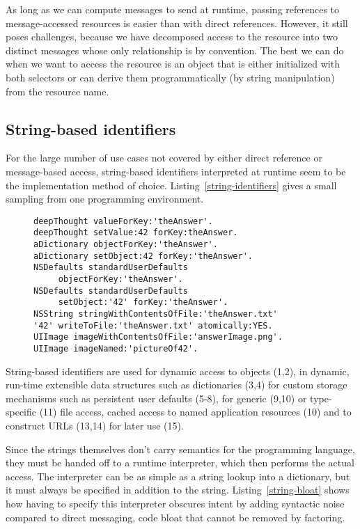 \documentclass[preprint,authoryear]{acm_proc_article-sp}
\begin{document}
As long as we can compute messages to send at runtime,
passing references to message-accessed resources is easier than with
direct references.  However, it still poses challenges, because we have decomposed
access to the resource into two distinct messages whose only relationship is by 
convention.  The best we can do when we want to access the resource
is an object that is either initialized with both selectors or can derive them
programmatically (by string manipulation) from the resource name.

\subsection{String-based identifiers}

For the large number of use cases not covered by either direct reference or
message-based access, string-based identifiers interpreted at runtime 
seem to be the implementation method of choice.  Listing~\ref{string-identifiers}
gives a small sampling from one programming environment.

\begin{figure}[htbp]
\begin{lstlisting}[style=numbers,label=string-identifiers,caption=Variants of string-based identifiers.]
deepThought valueForKey:'theAnswer'.
deepThought setValue:42 forKey:theAnswer.
aDictionary objectForKey:'theAnswer'.
aDictionary setObject:42 forKey:'theAnswer'.
NSDefaults standardUserDefaults
	 objectForKey:'theAnswer'.
NSDefaults standardUserDefaults
	 setObject:'42' forKey:'theAnswer'.
NSString stringWithContentsOfFile:'theAnswer.txt'
'42' writeToFile:'theAnswer.txt' atomically:YES.
UIImage imageWithContentsOfFile:'answerImage.png'.
UIImage imageNamed:'pictureOf42'.
\end{lstlisting}
\end{figure}

String-based identifiers are used for dynamic access to objects (1,2), 
in dynamic, run-time extensible data structures such as
dictionaries (3,4)  for custom storage mechanisms such as persistent
user defaults (5-8), for generic (9,10) or type-specific (11) file access, cached
access to named application resources (10) and to construct URLs (13,14)
for later use (15).

Since the strings themselves don't carry semantics for the programming language,
they must be handed off to a runtime interpreter, which then performs the actual access.  The 
interpreter can be as simple as a  string lookup into a dictionary,
but it must always be specified in addition to the string.  Listing~\ref{string-bloat}
shows how having to specify this interpreter obscures intent by adding syntactic
noise compared to direct messaging, code bloat that cannot be removed by factoring.
\end{document}

